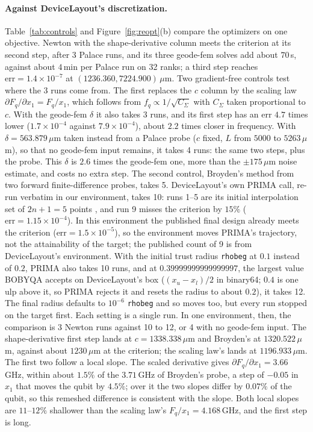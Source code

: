 \documentclass{anvil-paper}
\begin{document}
\paragraph{Against DeviceLayout's discretization.}
Table~\ref{tab:controls} and Figure~\ref{fig:reopt}(b) compare the
optimizers on one objective. Newton
with the shape-derivative column meets the criterion at its second step,
after 3 Palace runs, and its three geode-fem solves add about $70$\,s,
against about $4$\,min per Palace run on 32 ranks; a third step reaches
$\mathrm{err} = 1.4\times10^{-7}$ at $(1236.360, 7224.900)\,\mu$m. Two
gradient-free controls test where the 3 runs come from. The first replaces
the $c$ column by the scaling law $\partial F_q/\partial x_1 = F_q/x_1$,
which follows from $f_q \propto 1/\sqrt{C_\Sigma}$ with $C_\Sigma$ taken
proportional to $c$. With the
geode-fem $\delta$ it also takes 3 runs, and its first step has an err
$4.7$ times lower ($1.7\times10^{-4}$ against $7.9\times10^{-4}$), about
$2.2$ times closer in frequency. With $\delta = 563.879\,\mu$m taken
instead from a Palace probe ($c$ fixed, $L$ from $5000$ to
$5263\,\mu$m), so that no geode-fem input remains, it takes 4 runs: the
same two steps, plus the probe. This $\delta$ is $2.6$ times the geode-fem
one, more than the $\pm175\,\mu$m noise estimate, and costs no extra step.
The second control, Broyden's method \citep{broyden1965class} from two
forward finite-difference probes, takes 5. DeviceLayout's own PRIMA call,
re-run verbatim in our environment, takes 10: runs 1--5 are its initial
interpolation set of $2n+1 = 5$ points \citep{powell2009bobyqa}, and run 9 misses the criterion by $15\%$ ($\mathrm{err} =
1.15\times10^{-4}$). In this environment the published final design already
meets the criterion ($\mathrm{err} = 1.5\times10^{-5}$), so the environment
moves PRIMA's trajectory, not the attainability of the target; the
published count of 9 is from DeviceLayout's environment. With the initial
trust radius \texttt{rhobeg} at $0.1$ instead of $0.2$, PRIMA also takes 10
runs, and at $0.39999999999999997$, the largest value BOBYQA accepts on
DeviceLayout's box ($(x_u - x_l)/2$ in binary64; $0.4$ is one ulp above it,
so PRIMA rejects it and resets the radius to about $0.2$), it takes 12. The
final radius defaults to $10^{-6}$ \texttt{rhobeg} and so moves too, but
every run stopped on the target first. Each setting is a single run. In one environment,
then, the comparison is 3 Newton runs against 10 to 12, or 4 with no
geode-fem input. The shape-derivative first step lands at $c = 1338.338\,\mu$m and
Broyden's at $1320.522\,\mu$m, against about $1230\,\mu$m at the criterion;
the scaling law's lands at $1196.933\,\mu$m. The first two follow a local
slope. The
scaled derivative gives $\partial F_q/\partial x_1 = 3.66$\,GHz, within
about $1.5\%$ of the $3.71$\,GHz of Broyden's probe, a step of $-0.05$ in
$x_1$ that moves the qubit by $4.5\%$; over it the two slopes differ by
$0.07\%$ of the qubit, so this remeshed difference is consistent with the
slope. Both local slopes are $11$--$12\%$ shallower than the scaling law's
$F_q/x_1 = 4.168$\,GHz, and the first step is long.
\end{document}
